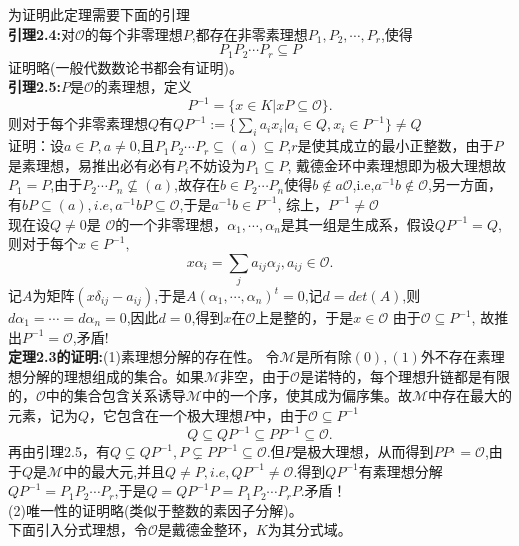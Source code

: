 \documentclass[UTF8]{article}
\begin{document}
    为证明此定理需要下面的引理\\
    \textbf{引理2.4:}对$\mathcal{O}$的每个非零理想$P$,都存在非零素理想$P_{1},P_{2},\cdots ,P_{r}$,使得$$
    P_{1} P_{2}\cdots P_{r} \subseteq P$$
    证明略(一般代数数论书都会有证明)。\\
    \textbf{引理2.5:}$P$是$\mathcal{O}$的素理想，定义$$
    P^{-1}=\{x \in K|xP \subseteq \mathcal{O}\}.
    $$
    则对于每个非零素理想$Q$有$QP^{-1}:=\{\sum_{i}a_{i}x_{i}|a_{i}\in Q,x_{i}\in P^{-1}\}\neq Q$\\
    证明：设$a\in P,a\neq 0$,且$P_{1}P_{2}\cdots P_{r}\subseteq (a)\subseteq P$,$r$是使其成立的最小正整数，由于$P$是素理想，易推出必有必有$P_{i}$不妨设为$P_{1}\subseteq P$,
    戴德金环中素理想即为极大理想故$P_{1}=P$,由于$P_{2}\cdots P_{n}\nsubseteq (a)$,故存在$b \in P_{2}\cdots P_{n}$使得$b\notin a\mathcal{O}$,i.e,$a^{-1}b\notin \mathcal{O}$,另一方面，有$bP\subseteq (a),i.e,a^{-1}bP\subseteq  \mathcal{O}$,于是$a^{-1}b\in P^{-1}$,
    综上，$P^{-1}\neq \mathcal{O}$\\
    现在设$Q\neq 0$是 $\mathcal{O}$的一个非零理想，$\alpha_{1},\cdots ,\alpha_{n}$是其一组是生成系，假设$QP^{-1}=Q$,则对于每个$x\in P^{-1},$
    $$x\alpha_{i}=\sum_{j}a_{ij}\alpha_{j},a_{ij}\in  \mathcal{O}.$$
    记$A$为矩阵$(x\delta_{ij}-a_{ij})$,于是$A(\alpha_{1},\cdots ,\alpha_{n})^{t}=0$,记$d=det(A)$,则$d\alpha_{1}=\cdots=d\alpha_{n}=0
    $,因此$d=0$,得到$x$在$ \mathcal{O}$上是整的，于是$x\in  \mathcal{O}$
    由于$ \mathcal{O} \subseteq P^{-1}$,
    故推出$P^{-1}= \mathcal{O}$,矛盾!\\
    \textbf{定理2.3的证明:}(1)素理想分解的存在性。
    令$ \mathcal{M}$是所有除$(0),(1)$外不存在素理想分解的理想组成的集合。如果$ \mathcal{M}$非空，由于$ \mathcal{O}$是诺特的，每个理想升链都是有限的，$ \mathcal{O}$中的集合包含关系诱导$ \mathcal{M}$中的一个序，使其成为偏序集。故$ \mathcal{M}$中存在最大的元素，记为$Q$，它包含在一个极大理想$P$中，由于$ \mathcal{O}\subseteq P^{-1}$
    $$Q\subseteq QP^{-1}\subseteq PP^{-1}\subseteq\mathcal{O}.$$
    再由引理2.5，有$Q\varsubsetneq QP^{-1},P\varsubsetneq PP^{-1}\subseteq  \mathcal{O}$.但$P$是极大理想，从而得到$PP^{_1}= \mathcal{O}$,由于$Q$是$ \mathcal{M}$中的最大元,并且$Q\neq P,i.e,QP^{-1}\neq  \mathcal{O}$.得到$QP^{-1}$有素理想分解$QP^{-1}=P_{1}P_{2}\cdots P_{r}$,于是$Q=QP^{-1}P=P_{1}P_{2}\cdots P_{r}P.$矛盾！\\
    (2)唯一性的证明略(类似于整数的素因子分解)。\\
    下面引入分式理想，令$\mathcal{O}$是戴德金整环，$K$为其分式域。\\
\end{document}
